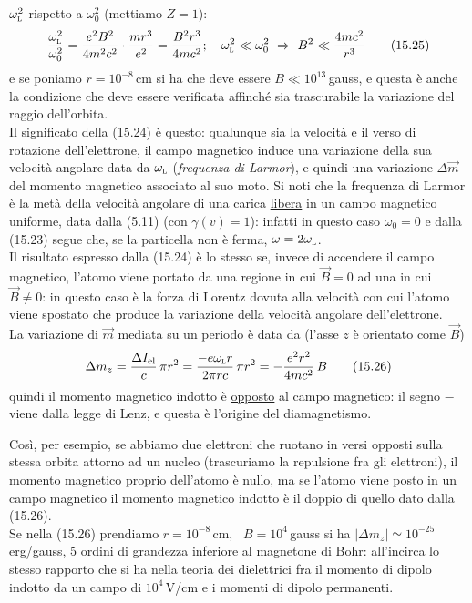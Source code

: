 $\omega_{\textsc l}^2$ rispetto a $\omega_0^2$ (mettiamo $Z=1$):
\begin{equation}
  \frac{\omega_{\textsc l}^2}{\omega_0^2}
  =\frac{e^2B^2}{4m^2c^2}\cdot\frac{mr^3}{e^2}=\frac{B^2r^3}{4mc^2};
  \quad\omega_{\textsc l}^2\ll\omega_0^2\ \Rightarrow\ B^2\ll\frac{4mc^2}{r^3}
  \tag{15.25}
\end{equation}
e se poniamo $r=10^{-8}\,$cm si ha che deve essere $B\ll10^{13}\,$gauss, e
questa \`e anche la condizione che deve essere verificata affinch\'e sia
trascurabile la variazione del raggio dell'orbita.\\
Il significato della (15.24) \`e questo: qualunque sia la velocit\`a e il verso
di rotazione dell'elettrone, il campo magnetico induce una variazione della sua
velocit\`a angolare data da $\omega_{\textsc l}$ (\textit{frequenza di Larmor}),
e quindi una variazione $\Delta\vec m$ del momento magnetico associato al suo
moto. Si noti che la frequenza di Larmor \`e la met\`a della velocit\`a angolare
di una carica \underline{libera} in un campo magnetico uniforme, data dalla
(5.11) (con $\gamma(v)=1$): infatti in questo caso $\omega_0=0$ e dalla (15.23)
segue che, se la particella non \`e ferma, $\omega=2\omega_{\textsc l}$.\\
Il risultato espresso dalla (15.24) \`e lo stesso se, invece di accendere il
campo magnetico, l'atomo viene portato da una regione in cui $\vec B=0$ ad una
in cui $\vec B\neq0$: in questo caso \`e la forza di Lorentz dovuta alla
velocit\`a con cui l'atomo viene spostato che produce la variazione della
velocit\`a angolare dell'elettrone.\\
La variazione di $\vec m$ mediata su un periodo \`e data da (l'asse $z$ \`e
orientato come $\vec B$)
\begin{equation}
  \Delta m_z=\frac{\Delta I_{\mathrm{el}}}{c}\,\pi r^2
  =\frac{-e\omega_{\textsc l}r}{2\pi rc}\,\pi r^2=-\frac{e^2r^2}{4mc^2}\,B
  \tag{15.26}
\end{equation}
quindi il momento magnetico indotto \`e \underline{opposto} al campo magnetico:
il segno $-$ viene dalla legge di Lenz, e questa \`e l'origine del
diamagnetismo.

Cos\`i, per esempio, se abbiamo due elettroni che ruotano in versi opposti sulla
stessa orbita attorno ad un nucleo (trascuriamo la repulsione fra gli
elettroni), il momento magnetico proprio dell'atomo \`e nullo, ma se l'atomo
viene posto in un campo magnetico il momento magnetico indotto \`e il doppio di
quello dato dalla (15.26).\\
Se nella (15.26) prendiamo $r=10^{-8}\,$cm, \ $B=10^4\,$gauss si ha
$|\Delta m_z|\simeq10^{-25}\,$erg/gauss, 5 ordini di grandezza inferiore al
magnetone di Bohr: all'incirca lo stesso rapporto che si ha nella teoria dei
dielettrici fra il momento di dipolo indotto da un campo di $10^4\,$V/cm e i
momenti di dipolo permanenti.

